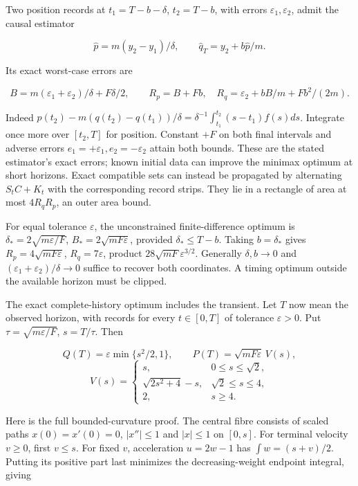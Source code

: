 \documentclass[11pt,a4paper]{article}
\begin{document}
Two position records at \(t_1=T-b-\delta\), \(t_2=T-b\), with errors
\(\varepsilon_1,\varepsilon_2\), admit the causal estimator

\[\widehat p=m(y_2-y_1)/\delta,\qquad
\widehat q_T=y_2+b\widehat p/m.\]

Its exact worst-case errors are

\[B=m(\varepsilon_1+\varepsilon_2)/\delta+F\delta/2,
\qquad R_p=B+Fb,\quad R_q=\varepsilon_2+bB/m+Fb^2/(2m).\]

Indeed
\(p(t_2)-m(q(t_2)-q(t_1))/\delta =\delta^{-1}\int_{t_1}^{t_2}(s-t_1)f(s)ds\).
Integrate once more over \([t_2,T]\) for position. Constant \(+F\) on
both final intervals and adverse errors
\(e_1=+\varepsilon_1,e_2=-\varepsilon_2\) attain both bounds. These are
the stated estimator's exact errors; known initial data can improve the
minimax optimum at short horizons. Exact compatible sets can instead be
propagated by alternating \(S_tC+K_t\) with the corresponding record
strips. They lie in a rectangle of area at most \(4R_qR_p\), an outer
area bound.

For equal tolerance \(\varepsilon\), the unconstrained finite-difference
optimum is \(\delta_*=2\sqrt{m\varepsilon/F}\),
\(B_*=2\sqrt{mF\varepsilon}\), provided \(\delta_*\le T-b\). Taking
\(b=\delta_*\) gives \(R_p=4\sqrt{mF\varepsilon}\),
\(R_q=7\varepsilon\), product \(28\sqrt{mF}\varepsilon^{3/2}\).
Generally \(\delta,b\to0\) and
\((\varepsilon_1+\varepsilon_2)/\delta\to0\) suffice to recover both
coordinates. A timing optimum outside the available horizon must be
clipped.

The exact complete-history optimum includes the transient. Let \(T\) now
mean the observed horizon, with records for every \(t\in[0,T]\) of
tolerance \(\varepsilon>0\). Put \(\tau=\sqrt{m\varepsilon/F}\),
\(s=T/\tau\). Then

\[Q(T)=\varepsilon\min\{s^2/2,1\},\qquad
P(T)=\sqrt{mF\varepsilon}\,V(s),\] \[V(s)=\begin{cases}
s,&0\le s\le\sqrt2,\\
\sqrt{2s^2+4}-s,&\sqrt2\le s\le4,\\
2,&s\ge4.
\end{cases}\]

Here is the full bounded-curvature proof. The central fibre consists of
scaled paths \(x(0)=x'(0)=0\), \(|x''|\le1\) and \(|x|\le1\) on
\([0,s]\). For terminal velocity \(v\ge0\), first \(v\le s\). For fixed
\(v\), acceleration \(u=2w-1\) has \(\int w=(s+v)/2\). Putting its
positive part last minimizes the decreasing-weight endpoint integral,
giving
\end{document}
